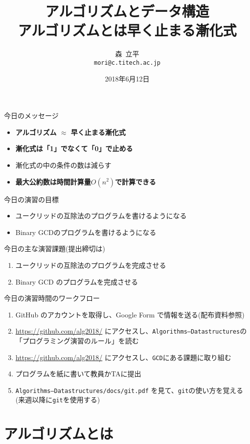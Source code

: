 \documentclass[a4paper,twoside,onecolumn,openany,article,10pt]{memoir}
\title{アルゴリズムとデータ構造\\\vspace{.5em} \Large アルゴリズムとは早く止まる漸化式}
\date{2018年6月12日}
\author{森~立平\\ \texttt{mori@c.titech.ac.jp}}
\theoremstyle{remark}
\begin{document}
\maketitle


\noindent
今日のメッセージ
\begin{itemize}
\item \textbf{アルゴリズム $\approx$ 早く止まる漸化式}
\item \textbf{漸化式は「1」でなくて「0」で止める}
\item 漸化式の中の条件の数は減らす
\item \textbf{最大公約数は時間計算量$O(n^2)$で計算できる}
\end{itemize}

\noindent
今日の演習の目標
\begin{itemize}
\item ユークリッドの互除法のプログラムを書けるようになる
\item Binary GCDのプログラムを書けるようになる
\end{itemize}

\noindent
今日の主な演習課題(提出締切は)
\begin{enumerate}
\item ユークリッドの互除法のプログラムを完成させる
\item Binary GCD のプログラムを完成させる
\end{enumerate}

\noindent
今日の演習時間のワークフロー
\begin{enumerate}
\item GitHub のアカウントを取得し、Google Form で情報を送る(配布資料参照)
\item \url{https://github.com/alg2018/} にアクセスし、\texttt{Algorithms--Datastructures}の「プログラミング演習のルール」を読む
\item \url{https://github.com/alg2018/} にアクセスし、\texttt{GCD}にある課題に取り組む
\item プログラムを紙に書いて教員かTAに提出
\item \texttt{Algorithms--Datastructures/docs/git.pdf} を見て、\texttt{git}の使い方を覚える(来週以降に\texttt{git}を使用する)
\end{enumerate}

\section{アルゴリズムとは}
\end{document}
